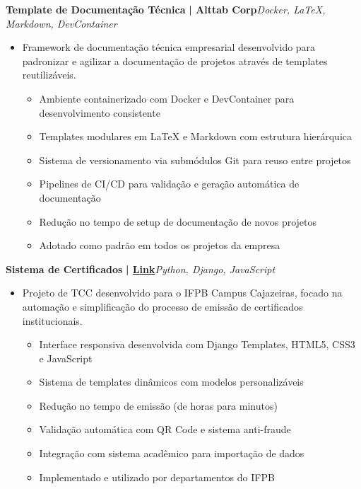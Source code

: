 \documentclass[a4paper]{article}
\begin{document}
{\textbf{Template de Documentação Técnica}}\textbf{ | Alttab Corp}\hfill{\sl Docker, LaTeX, Markdown, DevContainer}\\
\vspace{-3mm}
\begin{itemize} \itemsep -3pt
    \item[] Framework de documentação técnica empresarial desenvolvido para padronizar e agilizar a documentação de projetos através de templates reutilizáveis.
        \begin{itemize}
            \item Ambiente containerizado com Docker e DevContainer para desenvolvimento consistente
            \item Templates modulares em LaTeX e Markdown com estrutura hierárquica
            \item Sistema de versionamento via submódulos Git para reuso entre projetos
            \item Pipelines de CI/CD para validação e geração automática de documentação
            \item Redução no tempo de setup de documentação de novos projetos
            \item Adotado como padrão em todos os projetos da empresa
        \end{itemize}
\end{itemize}
\vspace*{2mm}

{\textbf{Sistema de Certificados}}\textbf{ | \href{https://github.com/bodescorp/Cext-final-}{Link}}\hfill{\sl Python, Django, JavaScript}\\
\vspace{-3mm}
\begin{itemize} \itemsep -3pt
    \item[] Projeto de TCC desenvolvido para o IFPB Campus Cajazeiras, focado na automação e simplificação do processo de emissão de certificados institucionais.
        \begin{itemize}
            \item Interface responsiva desenvolvida com Django Templates, HTML5, CSS3 e JavaScript
            \item Sistema de templates dinâmicos com modelos personalizáveis
            \item Redução no tempo de emissão (de horas para minutos)
            \item Validação automática com QR Code e sistema anti-fraude
            \item Integração com sistema acadêmico para importação de dados
            \item Implementado e utilizado por departamentos do IFPB
        \end{itemize}
\end{itemize}
\vspace*{2mm}
\end{document}
